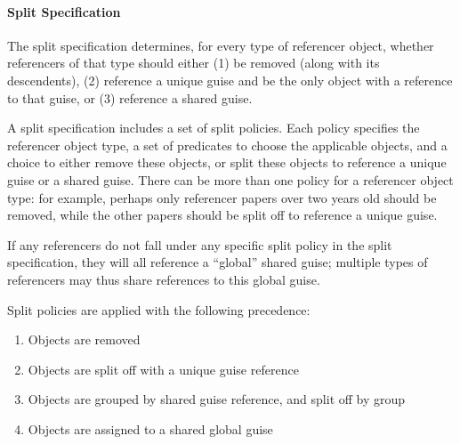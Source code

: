 \paragraph{Split Specification}
The split specification determines, for every type of referencer object, whether referencers of that
type should either (1) be removed (along with its descendents), (2) reference a unique guise and be
the only object with a reference to that guise, or (3) reference a shared guise. 

A split specification includes a set of split policies. Each policy specifies the referencer object
type, a set of predicates to choose the  applicable objects, and a choice to either remove these
objects, or split these objects to reference a unique guise or a shared guise.
There can be more than one policy for a referencer object type: for example, perhaps only
referencer papers over two years old should be removed, while the other papers should be split off
to reference a unique guise.

If any referencers do not fall under any specific split policy in the split specification, they will
all reference a ``global'' shared guise; multiple types of referencers may thus share references to
this global guise.

Split policies are applied with the following precedence:
\begin{enumerate}
    \item Objects are removed
    \item Objects are split off with a unique guise reference
    \item Objects are grouped by shared guise reference, and split off by group
    \item Objects are assigned to a shared global guise
\end{enumerate}

